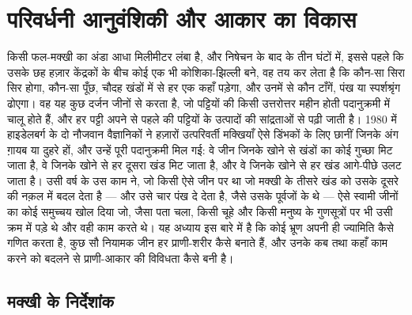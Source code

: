 \chapter{परिवर्धनी आनुवंशिकी और आकार का विकास}\label{ch:b3:developmental-genetics}

किसी फल-मक्खी का अंडा आधा मिलीमीटर लंबा है, और निषेचन के बाद के तीन
घंटों में, इससे पहले कि उसके छह हज़ार केंद्रकों के बीच कोई एक भी
कोशिका-झिल्ली बने, वह तय कर लेता है कि कौन-सा सिरा सिर होगा, कौन-सा
पूँछ, चौदह खंडों में से हर एक कहाँ पड़ेगा, और उनमें से कौन टाँगें, पंख
या स्पर्शश्रृंग ढोएगा। वह यह कुछ दर्जन जीनों से करता है, जो पट्टियों की
किसी उत्तरोत्तर महीन होती पदानुक्रमी में चालू होते हैं, और हर पट्टी अपने
से पहले की पट्टियों के उत्पादों की सांद्रताओं से पढ़ी जाती है। 1980 में
हाइडेलबर्ग के दो नौजवान वैज्ञानिकों ने हज़ारों उत्परिवर्ती मक्खियाँ ऐसे
डिंभकों के लिए छानीं जिनके अंग ग़ायब या दुहरे हों, और उन्हें पूरी
पदानुक्रमी मिल गई: वे जीन जिनके खोने से खंडों का कोई गुच्छा मिट जाता है,
वे जिनके खोने से हर दूसरा खंड मिट जाता है, और वे जिनके खोने से हर खंड
आगे-पीछे उलट जाता है। उसी वर्ष के उस काम ने, जो किसी ऐसे जीन पर था जो
मक्खी के तीसरे खंड को उसके दूसरे की नक़ल में बदल देता है --- और उसे चार
पंख दे देता है, जैसे उसके पूर्वजों के थे --- ऐसे स्वामी जीनों का कोई
समुच्चय खोल दिया जो, जैसा पता चला, किसी चूहे और किसी मनुष्य के
गुणसूत्रों पर भी उसी क्रम में पड़े थे और वही काम करते थे। यह अध्याय इस
बारे में है कि कोई भ्रूण अपनी ही ज्यामिति कैसे गणित करता है, कुछ सौ
नियामक जीन हर प्राणी-शरीर कैसे बनाते हैं, और उनके कब तथा कहाँ काम करने
को बदलने से प्राणी-आकार की विविधता कैसे बनी है।

\section{मक्खी के निर्देशांक}

